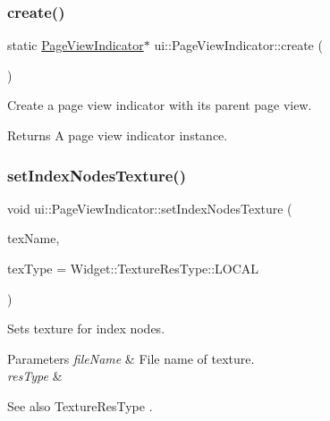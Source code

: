 \subsubsection{\texorpdfstring{create()}{create()}\hspace{0.1cm}{\footnotesize\ttfamily [2/2]}}
{\footnotesize\ttfamily static \hyperlink{classui_1_1PageViewIndicator}{Page\+View\+Indicator}$\ast$ ui\+::\+Page\+View\+Indicator\+::create (\begin{DoxyParamCaption}{ }\end{DoxyParamCaption})\hspace{0.3cm}{\ttfamily [static]}}

Create a page view indicator with its parent page view. \begin{DoxyReturn}{Returns}
A page view indicator instance. 
\end{DoxyReturn}
\mbox{\label{classui_1_1PageViewIndicator_a02f6ac9b071c66c829cb448416fa59e2}} 
\subsubsection{\texorpdfstring{set\+Index\+Nodes\+Texture()}{setIndexNodesTexture()}\hspace{0.1cm}{\footnotesize\ttfamily [1/2]}}
{\footnotesize\ttfamily void ui\+::\+Page\+View\+Indicator\+::set\+Index\+Nodes\+Texture (\begin{DoxyParamCaption}\item[{const std\+::string \&}]{tex\+Name,  }\item[{\hyperlink{classui_1_1Widget_a040a65ec5ad3b11119b7e16b98bd9af0}{Widget\+::\+Texture\+Res\+Type}}]{tex\+Type = {\ttfamily Widget\+:\+:TextureResType\+:\+:LOCAL} }\end{DoxyParamCaption})}

Sets texture for index nodes.


\begin{DoxyParams}{Parameters}
{\em file\+Name} & File name of texture. \\
\hline
{\em res\+Type} & \\
\hline
\end{DoxyParams}
\begin{DoxySeeAlso}{See also}
Texture\+Res\+Type . 
\end{DoxySeeAlso}
\mbox{\label{classui_1_1PageViewIndicator_a02f6ac9b071c66c829cb448416fa59e2}} 
